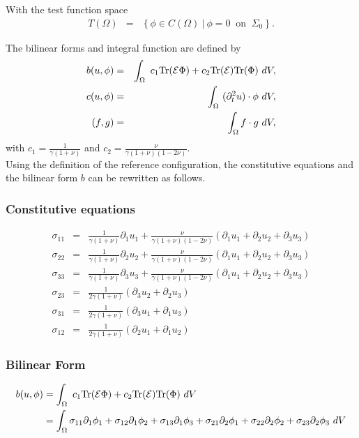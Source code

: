 \documentclass[../../main.tex]{subfiles}
\begin{document}
With the test function space
\begin{eqnarray*}
	T(\Omega) & = & \left\{ \phi \in C(\Omega) \ | \ \phi = 0 \ \textrm{ on } \ \Sigma_0 \right\}.
\end{eqnarray*}

The bilinear forms and integral function are defined by
\begin{eqnarray}
	b(u,\phi) &=& \int_\Omega~c_1\textrm{Tr}({\cal E}\Phi)+ c_2\textrm{Tr}({\cal E})
	\textrm{Tr}(\Phi) ~dV,\\
	c(u,\phi) &=& \int_\Omega~ (\partial^2_t u) \cdot \phi~dV, \\
	(f,g) &=& \int_{\Omega} f\cdot g \ dV, \\
\end{eqnarray}
with $\displaystyle c_1 = \frac{1}{\gamma(1+\nu)}$ and $\displaystyle c_2 = \frac{\nu}{\gamma(1+\nu)(1-2\nu)}$.\\


Using the definition of the reference configuration, the constitutive equations and the bilinear form $b$ can be rewritten as follows.
\subsubsection*{Constitutive equations}
\begin{eqnarray*}
	\sigma_{11} & = &  \frac{1}{\gamma(1+\nu)}\partial_1 u_1 + \frac{\nu}{\gamma (1+\nu)(1-2\nu)}(\partial_1 u_1 +  \partial_2 u_2 + \partial_3 u_3)\label{3DB_3}\\
	\sigma_{22} & = &  \frac{1}{\gamma(1+\nu)}\partial_2 u_2 + \frac{\nu}{\gamma (1+\nu)(1-2\nu)}(\partial_1 u_1 +  \partial_2 u_2 + \partial_3 u_3)\label{3DB_4}\\
	\sigma_{33} & = &  \frac{1}{\gamma(1+\nu)}\partial_3 u_3 + \frac{\nu}{\gamma (1+\nu)(1-2\nu)}(\partial_1 u_1 +  \partial_2 u_2 + \partial_3 u_3)\label{3DB_5}\\
	\sigma_{23} & = &  \frac{1}{2\gamma(1+\nu)}(\partial_3 u_2 + \partial_2 u_3)\label{3DB_6}\\
	\sigma_{31} & = &  \frac{1}{2\gamma(1+\nu)}(\partial_3 u_1 + \partial_1 u_3)\label{3DB_7}\\
	\sigma_{12} & = &  \frac{1}{2\gamma(1+\nu)}(\partial_2 u_1 + \partial_1 u_2)\label{3DB_8}
\end{eqnarray*}

\subsubsection{Bilinear Form}
\begin{align*}
	b(u,\phi)  &=  \int_\Omega~c_1\textrm{Tr}({\cal E}\Phi)+ c_2\textrm{Tr}({\cal E})
	\textrm{Tr}(\Phi) ~dV \nonumber\\
	 &=  \int_{\Omega} \sigma_{11} \partial_1\phi_1 + \sigma_{12}\partial_1 \phi_2 + \sigma_{13}\partial_1 \phi_3 + \sigma_{21}\partial_2 \phi_1 + \sigma_{22}\partial_2\phi_2 + \sigma_{23}\partial_2 \phi_3 ~dV
\end{align*}
\end{document}

